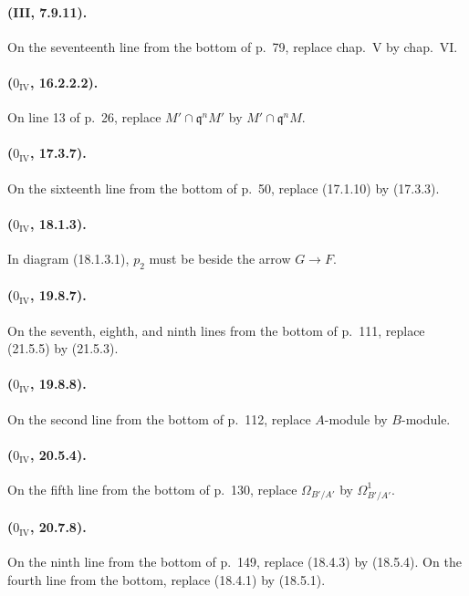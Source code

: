 \paragraph{(III, 7.9.11).}
On the seventeenth line from the bottom of p.~79, replace chap.~V by
chap.~VI.

\paragraph{($0_{\mathrm{IV}}$, 16.2.2.2).}
On line 13 of p.~26, replace $M'\cap\mathfrak q^nM'$ by
$M'\cap\mathfrak q^nM$.

\paragraph{($0_{\mathrm{IV}}$, 17.3.7).}
On the sixteenth line from the bottom of p.~50, replace (17.1.10) by
(17.3.3).

\paragraph{($0_{\mathrm{IV}}$, 18.1.3).}
In diagram (18.1.3.1), $p_2$ must be beside the arrow $G\to F$.

\paragraph{($0_{\mathrm{IV}}$, 19.8.7).}
On the seventh, eighth, and ninth lines from the bottom of p.~111,
replace (21.5.5) by (21.5.3).

\paragraph{($0_{\mathrm{IV}}$, 19.8.8).}
On the second line from the bottom of p.~112, replace $A$-module by
$B$-module.

\paragraph{($0_{\mathrm{IV}}$, 20.5.4).}
On the fifth line from the bottom of p.~130, replace
$\Omega_{B'/A'}$ by $\Omega^1_{B'/A'}$.

\paragraph{($0_{\mathrm{IV}}$, 20.7.8).}
On the ninth line from the bottom of p.~149, replace (18.4.3) by
(18.5.4).  On the fourth line from the bottom, replace (18.4.1) by
(18.5.1).

